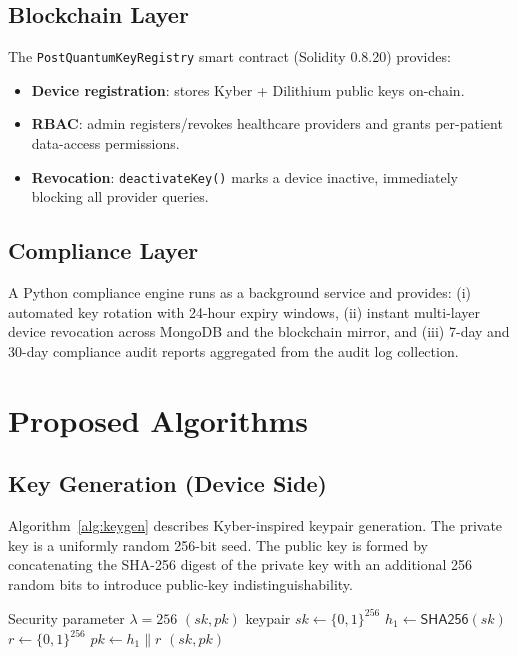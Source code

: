 \documentclass[conference]{IEEEtran}
\begin{document}
\subsection{Blockchain Layer}
The \texttt{PostQuantumKeyRegistry} smart contract (Solidity 0.8.20) provides:
\begin{itemize}
  \item \textbf{Device registration}: stores Kyber + Dilithium public keys on-chain.
  \item \textbf{RBAC}: admin registers/revokes healthcare providers and grants
        per-patient data-access permissions.
  \item \textbf{Revocation}: \texttt{deactivateKey()} marks a device inactive,
        immediately blocking all provider queries.
\end{itemize}

\subsection{Compliance Layer}
A Python compliance engine runs as a background service and provides:
(i) automated key rotation with 24-hour expiry windows,
(ii) instant multi-layer device revocation across MongoDB and the blockchain mirror, and
(iii) 7-day and 30-day compliance audit reports aggregated from the audit log collection.

\section{Proposed Algorithms}
\label{sec:algorithm}

\subsection{Key Generation (Device Side)}

Algorithm~\ref{alg:keygen} describes Kyber-inspired keypair generation. The private key
is a uniformly random 256-bit seed. The public key is formed by concatenating the
SHA-256 digest of the private key with an additional 256 random bits to introduce
public-key indistinguishability.

\begin{algorithm}[!t]
\caption{Post-Quantum KeyGen}\label{alg:keygen}
\begin{algorithmic}[1]
\REQUIRE Security parameter $\lambda = 256$
\ENSURE $(sk, pk)$ keypair
\STATE $sk \leftarrow \{0,1\}^{256}$ \quad {}
\STATE $h_1 \leftarrow \textsf{SHA256}(sk)$
\STATE $r   \leftarrow \{0,1\}^{256}$ \quad {}
\STATE $pk  \leftarrow h_1 \| r$
\RETURN $(sk, pk)$
\end{algorithmic}
\end{algorithm}
\end{document}
